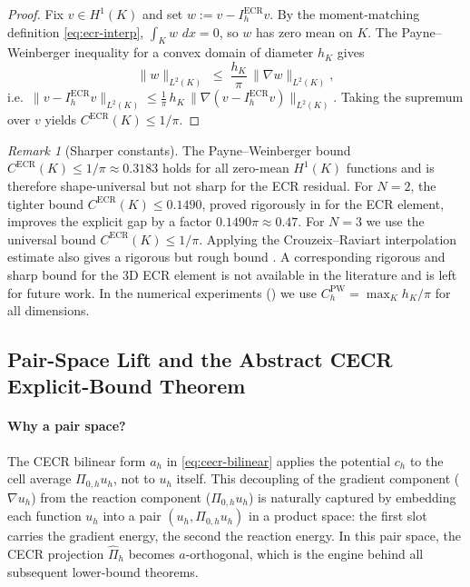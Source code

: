 \documentclass[11pt]{article}
\theoremstyle{plain}
\theoremstyle{definition}
\theoremstyle{remark}
\newtheorem{remark}{Remark}
\newcommand{\dx}{\,dx}
\newcommand{\ECR}{\mathrm{ECR}}
\begin{document}
\begin{proof}
Fix $v\in H^1(K)$ and set $w := v - I_h^{\ECR}v$.
By the moment-matching definition \eqref{eq:ecr-interp},
$\int_K w\,\dx = 0$, so $w$ has zero mean on $K$.
The Payne--Weinberger inequality \cite{PayneWeinberger1960,Bebendorf2003}
for a convex domain of diameter $h_K$ gives
\[
  \|w\|_{L^2(K)}
  \;\le\; \frac{h_K}{\pi}\,\|\nabla w\|_{L^2(K)},
\]
i.e.\ $\|v-I_h^{\ECR}v\|_{L^2(K)}
\le \frac{1}{\pi}\,h_K\,\|\nabla(v-I_h^{\ECR}v)\|_{L^2(K)}$.
Taking the supremum over $v$ yields $C^{\ECR}(K)\le 1/\pi$.
\end{proof}

\begin{remark}[Sharper constants]
\label{rmk:cecr-sharper}
The Payne--Weinberger bound $C^{\ECR}(K)\le 1/\pi\approx 0.3183$
holds for all zero-mean $H^1(K)$ functions and is therefore
shape-universal but not sharp for the ECR residual.
For $N=2$, the tighter bound $C^{\ECR}(K)\le 0.1490$,
proved rigorously in \cite{Xie2-Liu-2018} for the ECR element,
improves the explicit gap by a factor $0.1490\pi\approx 0.47$.
For $N=3$ we use the universal bound $C^{\ECR}(K)\le 1/\pi$.
Applying the Crouzeix--Raviart interpolation estimate also gives a
rigorous but rough bound \cite{Liu2015}. A corresponding rigorous and
sharp bound for the 3D ECR element is not available in the literature
and is left for future work.
In the numerical experiments () we use
$C_h^{\mathrm{PW}}=\max_K h_K/\pi$ for all dimensions.
\end{remark}

\subsection{Pair-Space Lift and the Abstract CECR Explicit-Bound Theorem}
\label{subsec:cecr-pair-space}

\paragraph{Why a pair space?}
The CECR bilinear form $a_h$ in \eqref{eq:cecr-bilinear}
applies the potential $c_h$ to the cell average
$\Pi_{0,h}u_h$, not to $u_h$ itself. This decoupling of the
gradient component ($\nabla u_h$) from the reaction component
($\Pi_{0,h}u_h$) is naturally captured by embedding each function
$u_h$ into a pair $(u_h,\Pi_{0,h}u_h)$ in a product space: the
first slot carries the gradient energy, the second the reaction
energy. In this pair space, the CECR projection
$\widehat\Pi_h$ becomes $\widehat a$-orthogonal, which is the
engine behind all subsequent lower-bound theorems.
\end{document}
